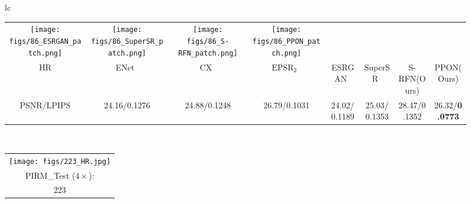 \documentclass[preprint]{elsarticle}
\begin{document}
\begin{figure*}[htpb]
{\begin{tabular}{lc}
\begin{adjustbox}{valign=t}
\begin{tabular}{cccccccc}
					\texttt{[image: figs/86\_ESRGAN\_patch.png]} &
					\hspace{-3mm}
					\texttt{[image: figs/86\_SuperSR\_patch.png]} &
					\hspace{-3mm}
					\texttt{[image: figs/86\_S-RFN\_patch.png]} &
					\hspace{-3mm}
					\texttt{[image: figs/86\_PPON\_patch.png]} \\
					HR & \hspace{-3mm} ENet~\cite{EnhanceNet} & \hspace{-3mm} CX~\cite{CX} & \hspace{-3mm} $\text{EPSR}_2$~\cite{EPSR} &
					\hspace{-3mm} ESRGAN~\cite{ESRGAN} & \hspace{-3mm} SuperSR~\cite{ESRGAN} & \hspace{-3mm} S-RFN(Ours) & \hspace{-3mm} PPON(Ours) \\
					PSNR/LPIPS & \hspace{-3mm} 24.16/0.1276 & \hspace{-3mm} 24.88/0.1248 & \hspace{-3mm} 26.79/0.1031 & \hspace{-3mm} 24.02/0.1189 & \hspace{-3mm} 25.03/0.1353 & \hspace{-3mm} 28.47/0.1352 & \hspace{-3mm} 26.32/\textbf{0.0773} \\
				\end{tabular}
			\end{adjustbox}
			\\
			\begin{adjustbox}{valign=t}
				\scriptsize
				\begin{tabular}{c}
					\texttt{[image: figs/223\_HR.jpg]} \\
					PIRM\_Test ($4 \times$): \\
					223 \\
				\end{tabular}
			\end{adjustbox}
			\hspace{-3mm}
			\begin{adjustbox}{valign=t}
				\scriptsize
				\begin{tabular}{cccccccc}

\end{tabular}
\end{adjustbox}
\end{tabular}}
\end{figure*}
\end{document}
